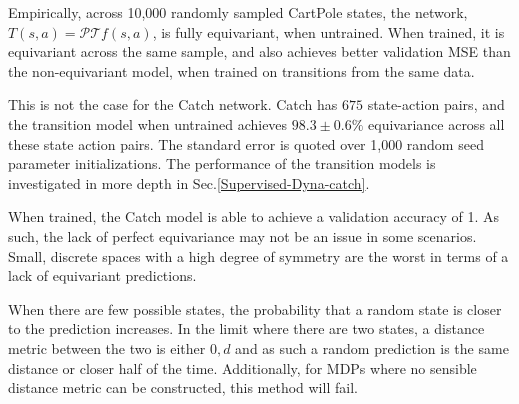 Empirically, across 10,000 randomly sampled CartPole states, the network, $T(s, a)= \mathcal{P}\mathcal{T}f(s,a)$, is fully equivariant, when untrained. When trained, it is equivariant across the same sample, and also achieves better validation MSE than the non-equivariant model, when trained on transitions from the same data.

This is not the case for the Catch network. Catch has $675$ state-action pairs, and the transition model when untrained achieves $98.3 \pm 0.6\%$ equivariance across all these state action pairs. The standard error is quoted over 1,000 random seed parameter initializations. The performance of the transition models is investigated in more depth in Sec.\ref{Supervised-Dyna-catch}.

When trained, the Catch model is able to achieve a validation accuracy of 1. As such, the lack of perfect equivariance may not be an issue in some scenarios. Small, discrete spaces with a high degree of symmetry are the worst in terms of a lack of equivariant predictions.

When there are few possible states, the probability that a random state is closer to the prediction increases. In the limit where there are two states, a distance metric between the two is either $0, d$ and as such a random prediction is the same distance or closer half of the time.  Additionally, for MDPs where no sensible distance metric can be constructed, this method will fail.

